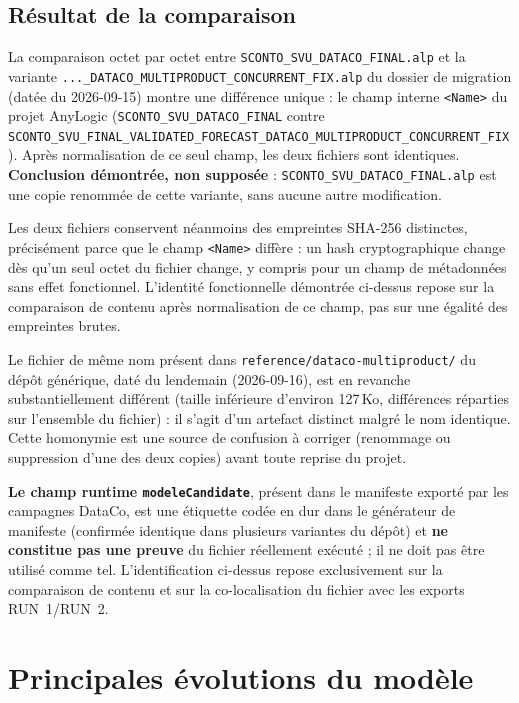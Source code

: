 \documentclass[11pt,a4paper]{article}
\newcommand{\code}[1]{\texttt{#1}}
\begin{document}
\subsection{Résultat de la comparaison}

La comparaison octet par octet entre \code{SCONTO\_SVU\_\allowbreak DATACO\_FINAL.alp}
et la variante \code{...\_DATACO\_\allowbreak MULTIPRODUCT\_\allowbreak CONCURRENT\_FIX.alp} du
dossier de migration (datée du 2026-09-15) montre une différence unique :
le champ interne \code{<Name>} du projet AnyLogic
(\code{SCONTO\_SVU\_\allowbreak DATACO\_FINAL} contre
\code{SCONTO\_SVU\_\allowbreak FINAL\_\allowbreak VALIDATED\_\allowbreak FORECAST\_\allowbreak DATACO\_\allowbreak MULTIPRODUCT\_\allowbreak CONCURRENT\_FIX}).
Après normalisation de ce seul champ, les deux fichiers sont identiques.
\textbf{Conclusion démontrée, non supposée} : \code{SCONTO\_SVU\_\allowbreak DATACO\_FINAL.alp}
est une copie renommée de cette variante, sans aucune autre modification.

Les deux fichiers conservent néanmoins des empreintes SHA-256 distinctes,
précisément parce que le champ \code{<Name>} diffère : un hash
cryptographique change dès qu'un seul octet du fichier change, y compris
pour un champ de métadonnées sans effet fonctionnel. L'identité
fonctionnelle démontrée ci-dessus repose sur la comparaison de contenu
après normalisation de ce champ, pas sur une égalité des empreintes
brutes.

Le fichier de même nom présent dans
\code{reference/dataco-multiproduct/} du dépôt générique, daté du
lendemain (2026-09-16), est en revanche substantiellement différent
(taille inférieure d'environ 127\,Ko, différences réparties sur l'ensemble
du fichier) : il s'agit d'un artefact distinct malgré le nom identique.
Cette homonymie est une source de confusion à corriger (renommage ou
suppression d'une des deux copies) avant toute reprise du projet.

\textbf{Le champ runtime \code{modeleCandidate}}, présent dans le manifeste
exporté par les campagnes DataCo, est une étiquette codée en dur dans le
générateur de manifeste (confirmée identique dans plusieurs variantes du
dépôt) et \textbf{ne constitue pas une preuve} du fichier réellement
exécuté ; il ne doit pas être utilisé comme tel. L'identification
ci-dessus repose exclusivement sur la comparaison de contenu et sur la
co-localisation du fichier avec les exports RUN~1/RUN~2.

\section{Principales évolutions du modèle}
\end{document}
